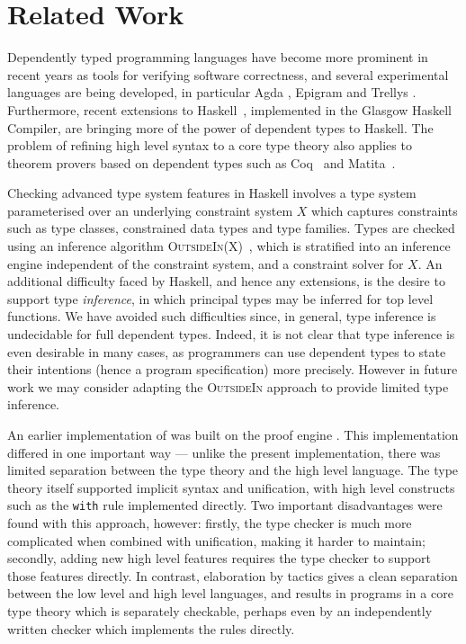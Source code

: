 \section{Related Work}

\label{sect:related}

Dependently typed programming languages have become more prominent in recent
years as tools for verifying software correctness, and several experimental
languages are being developed, in particular Agda \cite{norell2007thesis},
Epigram \cite{McBride2004a,Levitation2010} and Trellys \cite{Kimmell2012}.
Furthermore, recent extensions to Haskell~\cite{Haskell98}, implemented in the
Glasgow Haskell Compiler, are bringing more of the power of dependent types to
Haskell. The problem of refining high level syntax to a core type theory also
applies to theorem provers based on dependent types such as
Coq~\cite{Bertot2004} and Matita~\cite{Asperti2011}.

Checking advanced type system features in Haskell involves a type system
parameterised over an underlying constraint system $X$ which captures
constraints such as type classes, constrained data types and type families.
Types are checked using an inference algorithm
\textsc{OutsideIn(X)}~\cite{Vytiniotis2011}, which is stratified into an
inference engine independent of the constraint
system, and a constraint solver for $X$. An additional difficulty faced by
Haskell, and hence any extensions, is the desire to support type \emph{inference}, in
which principal types may be inferred for top level functions. We have avoided
such difficulties since, in general, type
inference is undecidable for full dependent types. Indeed, it is not clear
that type inference is even desirable in many cases, as programmers
can use dependent types to state their intentions (hence a program
specification) more precisely. However in future work we
may consider adapting the \textsc{OutsideIn} approach to provide limited type
inference.

An earlier implementation of \Idris{} was built on the \Ivor{} proof engine
\cite{Brady2006b}. This implementation differed in one important way --- unlike
the present implementation, there was limited separation between the type
theory and the high level language. The type theory itself supported implicit
syntax and unification, with high level constructs such as the \texttt{with}
rule implemented directly. Two important disadvantages were found with this
approach, however: firstly, the type checker is much more complicated when
combined with unification, making it harder to maintain; secondly, adding new
high level features requires the type checker to support those features
directly. In contrast, elaboration by tactics gives a clean separation between
the low level and high level languages, and results in programs in a core
type theory which is separately checkable, perhaps even by an independently
written checker which implements the \TT{} rules directly.

